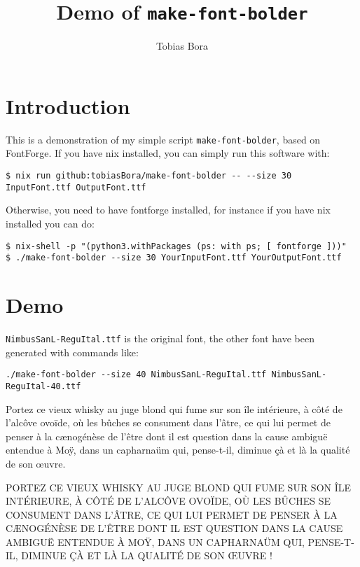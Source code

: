 \documentclass[11pt]{article}
\date{}
\title{Demo of \texttt{make-font-bolder}}
\author{Tobias Bora}
\begin{document}
\maketitle

\section{Introduction}

This is a demonstration of my simple script \texttt{make-font-bolder}, based on FontForge. If you have nix installed, you can simply run this software with:

\begin{verbatim}
$ nix run github:tobiasBora/make-font-bolder -- --size 30 InputFont.ttf OutputFont.ttf
\end{verbatim}

Otherwise, you need to have fontforge installed, for instance if you have nix installed you can do:

\begin{verbatim}
$ nix-shell -p "(python3.withPackages (ps: with ps; [ fontforge ]))"
$ ./make-font-bolder --size 30 YourInputFont.ttf YourOutputFont.ttf
\end{verbatim}

\section{Demo}

\texttt{NimbusSanL-ReguItal.ttf} is the original font, the other font have been generated with commands like:
\begin{verbatim}
./make-font-bolder --size 40 NimbusSanL-ReguItal.ttf NimbusSanL-ReguItal-40.ttf
\end{verbatim}









\medskip

{ Portez ce vieux whisky au juge blond qui fume sur son île intérieure, à côté de l'alcôve ovoïde, où les bûches se consument dans l'âtre, ce qui lui permet de penser à la cænogénèse de l'être dont il est question dans la cause ambiguë entendue à Moÿ, dans un capharnaüm qui, pense-t-il, diminue çà et là la qualité de son œuvre.

  \medskip

  PORTEZ CE VIEUX WHISKY AU JUGE BLOND QUI FUME SUR SON ÎLE INTÉRIEURE, À CÔTÉ DE L'ALCÔVE OVOÏDE, OÙ LES BÛCHES SE CONSUMENT DANS L'ÂTRE, CE QUI LUI PERMET DE PENSER À LA CÆNOGÉNÈSE DE L'ÊTRE DONT IL EST QUESTION DANS LA CAUSE AMBIGUË ENTENDUE À MOŸ, DANS UN CAPHARNAÜM QUI, PENSE-T-IL, DIMINUE ÇÀ ET LÀ LA QUALITÉ DE SON ŒUVRE !
}
\end{document}
